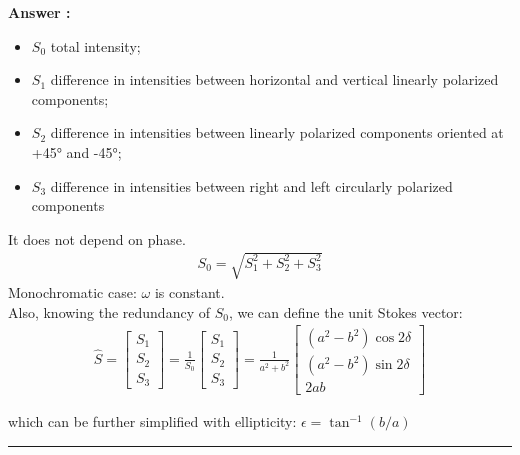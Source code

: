 \documentclass[a4paper,11pt]{book}
\newcounter{qacount}
\newenvironment{answer}{
  \noindent\textbf{Answer \theqacount:}\space
}{
  \par\vspace{1em}   %
  \hrule             %
  \vspace{0.5em}     %
}
\begin{document}
\begin{answer}
    \begin{itemize}
        \item $S_0$ total intensity;
        \item $S_1$ difference in intensities between horizontal and vertical linearly polarized components;
        \item $S_2$ difference in intensities between linearly polarized components oriented at +45° and -45°;
        \item $S_3$ difference in intensities between right and left circularly polarized components
    \end{itemize}
    It does not depend on phase.
    \begin{align}
        S_0 = \sqrt{S_1^2 + S_2^2 + S_3^2}
    \end{align}
    Monochromatic case: $\omega$ is constant.\\
    Also, knowing the redundancy of $S_0$, we can define the unit Stokes vector:
    \begin{align}
        \hat{S} = \begin{bmatrix} S_1 \\ S_2 \\ S_3 \end{bmatrix} =
        \frac{1}{S_0} \begin{bmatrix} S_1 \\ S_2 \\ S_3 \end{bmatrix} =
        \frac{1}{a^2 + b^2} \begin{bmatrix}
                                (a^2 - b^2) \cos 2\delta \\
                                (a^2 - b^2) \sin 2\delta \\
                                2ab
                            \end{bmatrix}
    \end{align}

    which can be further simplified with ellipticity: $\epsilon = \tan^{-1}(b/a)$



\end{answer}
\end{document}
